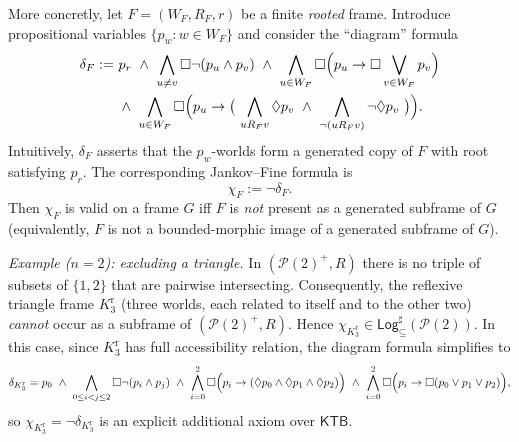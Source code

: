 \documentclass[11pt]{amsart}
\theoremstyle{definition}
\theoremstyle{plain}
\newcommand{\Pow}{\mathcal P}
\newcommand{\KTB}{\mathsf{KTB}}
\newcommand{\Logsub}{\mathsf{Log}_{\subseteq}^{\sharp}}
\begin{document}













More concretly, let $F=(W_F,R_F,r)$ be a finite \emph{rooted} frame.
Introduce propositional variables $\{p_w:w\in W_F\}$ and consider the ``diagram'' formula
\begin{align*}
\delta_F :=\ &p_r\ \wedge\ \bigwedge_{u\neq v}\Box\neg(p_u\wedge p_v)\ \wedge\ \bigwedge_{u\in W_F}\Box\Bigl(p_u\to\Box\bigvee_{v\in W_F}p_v\Bigr)\\
&\wedge\ \bigwedge_{u\in W_F}\Box\Bigl(p_u\to\bigl(\ \bigwedge_{uR_F v}\Diamond p_v\ \wedge\ \bigwedge_{\neg(uR_F v)}\neg\Diamond p_v\ \bigr)\Bigr).
\end{align*}
Intuitively, $\delta_F$ asserts that the $p_w$-worlds form a generated copy of $F$ with root satisfying $p_r$.
The corresponding Jankov--Fine formula is
\[\chi_F:=\neg\delta_F.\]
Then $\chi_F$ is valid on a frame $G$ iff $F$ is \emph{not} present as a generated subframe of $G$ (equivalently,
$F$ is not a bounded-morphic image of a generated subframe of $G$).

\smallskip
\noindent\emph{Example  ($n=2$): excluding a triangle.}
In $(\Pow(2)^+,R)$ there is no triple of subsets of $\{1,2\}$ that are pairwise intersecting.
Consequently, the reflexive triangle frame $K_3^\mathrm{r}$ (three worlds, each related to itself and to the other two)
\emph{cannot} occur as a subframe of $(\Pow(2)^+,R)$.
Hence $\chi_{K_3^\mathrm{r}}\in\Logsub(\Pow(2))$.
In this case, since $K_3^\mathrm{r}$ has full accessibility relation, the diagram formula simplifies to
\[
\delta_{K_3^\mathrm{r}} = p_0\ \wedge\ \bigwedge_{0\le i<j\le 2}\Box\neg(p_i\wedge p_j)\ \wedge\ \bigwedge_{i=0}^2\Box\Bigl(p_i\to (\Diamond p_0\wedge\Diamond p_1\wedge\Diamond p_2)\Bigr)\ \wedge\ \bigwedge_{i=0}^2\Box\Bigl(p_i\to\Box(p_0\vee p_1\vee p_2)\Bigr),
\]
so $\chi_{K_3^\mathrm{r}}=\neg\delta_{K_3^\mathrm{r}}$ is an explicit additional axiom over $\KTB$.
\end{document}
